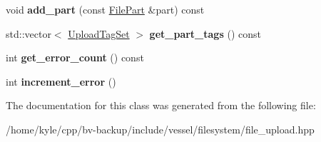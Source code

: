 \begin{DoxyCompactItemize}
void {\bfseries add\+\_\+part} (const \hyperlink{struct_vessel_1_1_types_1_1_file_part}{File\+Part} \&part) const
\item 
\mbox{\label{class_vessel_1_1_file_1_1_file_upload_a9bb4ff3bb9b28a506a2907ddd7373a08}} 
std\+::vector$<$ \hyperlink{struct_vessel_1_1_types_1_1_upload_tag_set}{Upload\+Tag\+Set} $>$ {\bfseries get\+\_\+part\+\_\+tags} () const
\item 
\mbox{\label{class_vessel_1_1_file_1_1_file_upload_a2fd38aef6fbc243aa677e4f74bb70168}} 
int {\bfseries get\+\_\+error\+\_\+count} () const
\item 
\mbox{\label{class_vessel_1_1_file_1_1_file_upload_ae86a8cab440ab34b762232227c27ed68}} 
int {\bfseries increment\+\_\+error} ()
\end{DoxyCompactItemize}


The documentation for this class was generated from the following file\+:\begin{DoxyCompactItemize}
\item 
/home/kyle/cpp/bv-\/backup/include/vessel/filesystem/file\+\_\+upload.\+hpp\end{DoxyCompactItemize}
